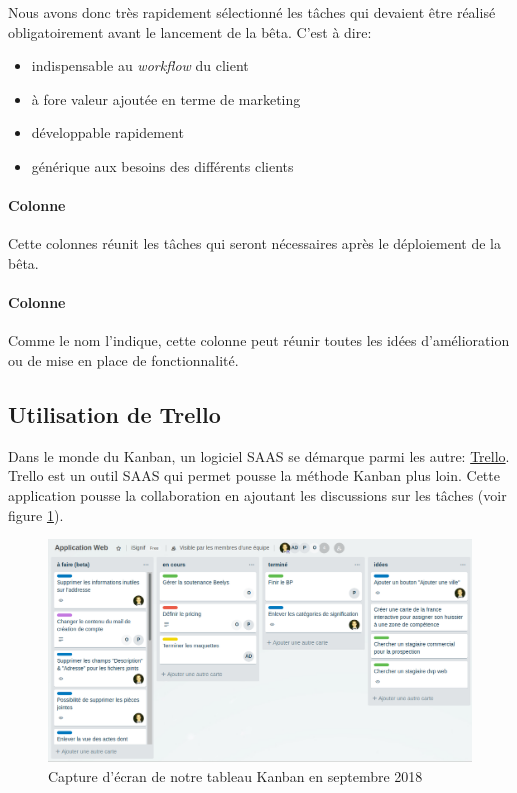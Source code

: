 \documentclass[]{report}
\begin{document}
        Nous avons donc très rapidement sélectionné les tâches qui devaient être réalisé obligatoirement avant le lancement de la bêta. C'est à dire:

        \begin{itemize}
          \item indispensable au \textit{workflow} du client
          \item à fore valeur ajoutée en terme de marketing
          \item développable rapidement
          \item générique aux besoins des différents clients
        \end{itemize}

      \paragraph{Colonne }

        Cette colonnes réunit les tâches qui seront nécessaires après le déploiement de la bêta.

      \paragraph{Colonne }

        Comme le nom l'indique, cette colonne peut réunir toutes les idées d'amélioration ou de mise en place de fonctionnalité.

    \subsection{Utilisation de Trello}

      Dans le monde du Kanban, un logiciel SAAS se démarque parmi les autre: \href{http://trello.com/}{Trello}. Trello est un outil SAAS qui permet pousse la méthode Kanban plus loin. Cette application pousse la collaboration en ajoutant les discussions sur les tâches (voir figure \ref{fig:trello}).

      \begin{figure}
        \includegraphics[width=\linewidth]{img/trello.png}
        \caption{Capture d'écran de notre tableau Kanban en septembre 2018}
        \label{fig:trello}
      \end{figure}
\end{document}

